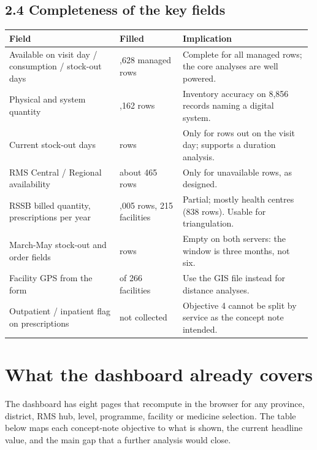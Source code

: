\documentclass[10pt,a4paper]{article}
\begin{document}
\subsection{2.4 Completeness of the key fields}
{\footnotesize\setlength{\tabcolsep}{3pt}
\begin{longtable}{>{\raggedright\arraybackslash}p{0.357\linewidth}>{\raggedright\arraybackslash}p{0.208\linewidth}>{\raggedright\arraybackslash}p{0.415\linewidth}}
\rowcolor{navy}\textbf{\color{white}Field} & \textbf{\color{white}Filled} & \textbf{\color{white}Implication} \\
\endhead
Available on visit day / consumption / stock-out days & 9,628 managed rows & Complete for all managed rows; the core analyses are well powered. \\
\rowcolor{band}Physical and system quantity & 9,162 rows & Inventory accuracy on 8,856 records naming a digital system. \\
Current stock-out days & 460 rows & Only for rows out on the visit day; supports a duration analysis. \\
\rowcolor{band}RMS Central / Regional availability & about 465 rows & Only for unavailable rows, as designed. \\
RSSB billed quantity, prescriptions per year & 1,005 rows, 215 facilities & Partial; mostly health centres (838 rows). Usable for triangulation. \\
\rowcolor{band}March-May stock-out and order fields & 0 rows & Empty on both servers: the window is three months, not six. \\
Facility GPS from the form & 129 of 266 facilities & Use the GIS file instead for distance analyses. \\
\rowcolor{band}Outpatient / inpatient flag on prescriptions & not collected & Objective 4 cannot be split by service as the concept note intended. \\
\end{longtable}}
\section{What the dashboard already covers}
The dashboard has eight pages that recompute in the browser for any province, district, RMS hub, level, programme, facility or medicine selection. The table below maps each concept-note objective to what is shown, the current headline value, and the main gap that a further analysis would close.
\end{document}
